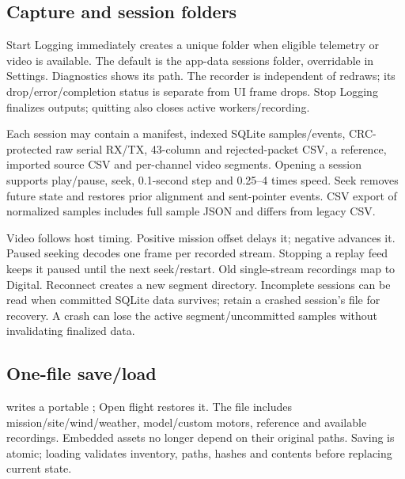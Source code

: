 \subsection{Capture and session folders}
Start Logging immediately creates a unique folder when eligible telemetry or
video is available. The default is the app-data sessions folder, overridable
in Settings. Diagnostics shows its path. The recorder is independent of
redraws; its drop/error/completion status is separate from UI frame drops.
Stop Logging finalizes outputs; quitting also closes active workers/recording.

Each session may contain a manifest, indexed SQLite samples/events, CRC-protected
raw serial RX/TX, 43-column  and rejected-packet CSV, a
reference, imported source CSV and per-channel video segments. Opening a session
supports play/pause, seek, 0.1-second step and 0.25--4 times speed. Seek removes
future state and restores prior alignment and sent-pointer events. CSV export
of normalized samples includes full sample JSON and differs from legacy CSV.

Video follows host timing. Positive mission offset delays it; negative advances
it. Paused seeking decodes one frame per recorded stream. Stopping a replay
feed keeps it paused until the next seek/restart. Old single-stream recordings
map to Digital. Reconnect creates a new segment directory. Incomplete sessions
can be read when committed SQLite data survives; retain a crashed session's
 file for recovery. A crash can lose the active segment/uncommitted
samples without invalidating finalized data.

\subsection{One-file save/load}
 writes a portable ; Open flight
restores it. The file includes mission/site/wind/weather, model/custom motors,
reference and available recordings. Embedded assets no longer depend on
their original paths. Saving is atomic; loading validates inventory, paths,
hashes and contents before replacing current state.

